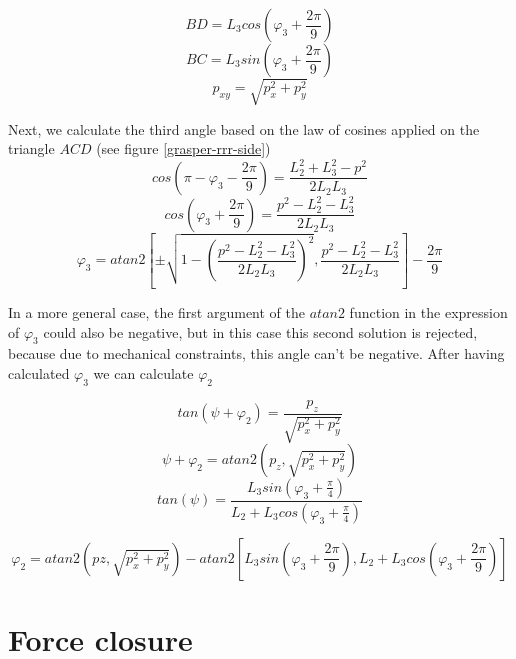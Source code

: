 \begin{equation}
BD = L_3 cos(φ_3 + \frac{2π}{9})
\end{equation}
\begin{equation}
BC = L_3 sin(φ_3 + \frac{2π}{9})
\end{equation}
\begin{equation}
p_{xy} = \sqrt{p_x^2 + p_y^2}
\end{equation}

Next, we calculate the third angle based on the law of cosines applied on the triangle $ACD$ (see figure \ref{grasper-rrr-side})
\begin{equation}
cos \left( π - φ_3 - \frac{2π}{9} \right) = \frac{L_2^2 + L_3^2 - p^2}{2 L_2 L_3}
\end{equation}
\begin{equation}
cos \left(φ_3 + \frac{2π}{9} \right) = \frac{p^2 - L_2^2 - L_3^2}{2 L_2 L_3}
\end{equation}
\begin{equation}
φ_3 = atan2 \left[ \pm \sqrt{1 - \left( \frac{p^2 - L_2^2 - L_3^2}{2 L_2 L_3} \right)^2} , \frac{p^2 - L_2^2 - L_3^2}{2 L_2 L_3} \right] - \frac{2π}{9}
\end{equation}

In a more general case, the first argument of the $atan2$ function in the expression of $φ_3$ could also be negative,
but in this case this second solution is rejected, because due to mechanical constraints, this angle can't be negative. 
After having calculated $φ_3$ we can calculate $φ_2 $

\begin{equation}
tan \left( ψ + φ_2 \right) = \frac{p_z}{\sqrt{p_x^2 + p_y^2}}
\end{equation}
\begin{equation}
ψ + φ_2 = atan2 \left( p_z, \sqrt{p_x^2 + p_y^2} \right)
\end{equation}
\begin{equation}
tan \left( ψ \right) = \frac{L_3 sin \left( φ_3 + \frac{π}{4} \right) }{L_2 + L_3 cos \left( φ_3 + \frac{π}{4} \right)}
\end{equation}

\begin{equation}
φ_2 = atan2 \left( pz, \sqrt{p_x^2 + p_y^2} \right) - atan2 \left[ L_3 sin \left( φ_3 + \frac{2π}{9} \right), L_2 + L_3 cos \left( φ_3 + \frac{2π}{9} \right) \right]
\end{equation}

\section{Force closure}

